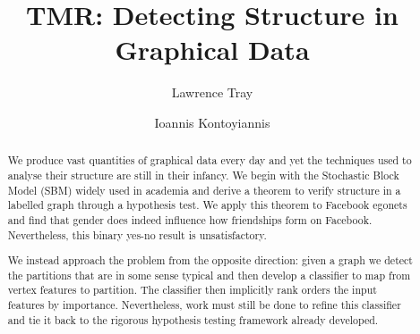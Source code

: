\documentclass[11pt]{article}
\title{TMR: Detecting Structure in Graphical Data}
\author{Lawrence Tray \and Ioannis Kontoyiannis}
\begin{document}
\maketitle

\begin{abstract}
We produce vast quantities of graphical data every day and yet the techniques used to analyse their structure are still in their infancy. We begin with the Stochastic Block Model (SBM) widely used in academia and derive a theorem to verify structure in a labelled graph through a hypothesis test. We apply this theorem to Facebook egonets and find that gender does indeed influence how friendships form on Facebook. Nevertheless, this binary yes-no result is unsatisfactory.

We instead approach the problem from the opposite direction: given a graph we detect the partitions that are in some sense typical and then develop a classifier to map from vertex features to partition. The classifier then implicitly rank orders the input features by importance. Nevertheless, work must still be done to refine this classifier and tie it back to the rigorous hypothesis testing framework already developed.
\end{abstract}
\end{document}
